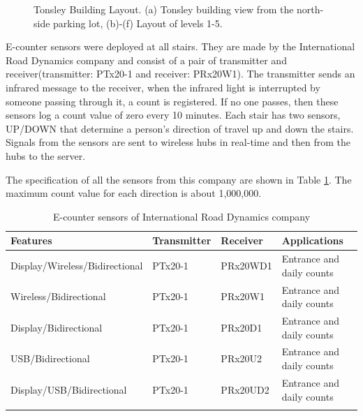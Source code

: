 \begin{figure}[ht]
\caption{Tonsley Building Layout. (a) Tonsley building view from the north-side parking lot, (b)-(f) Layout of levels 1-5.}
\label{laay}
\end{figure}

E-counter sensors were deployed at all stairs. They are made by the International Road Dynamics company and consist of a pair of transmitter and receiver(transmitter: PTx20-1 and receiver: PRx20W1). The transmitter sends an infrared message to the receiver, when the infrared light is interrupted by someone passing through it, a count is registered. If no one passes, then these sensors log a count value of zero every 10 minutes. Each stair has two sensors, UP/DOWN that determine a person's direction of travel up and down the stairs. Signals from the sensors are sent to wireless hubs in real-time and then from the hubs to the server. 

The specification of all the sensors from this company are shown in Table \ref{sensor}. The maximum count value for each direction is about 1,000,000.

\begin{table}[!h]{}
 \small
\centering
\caption{E-counter sensors of International Road Dynamics company}%
\begin{tabular}{llll}
 \toprule
\textbf{Features} & \textbf{Transmitter} & \textbf{Receiver}  & \textbf{Applications}     \\
\midrule
 Display/Wireless/Bidirectional     &  PTx20-1 & PRx20WD1 & Entrance and daily counts\\ 
Wireless/Bidirectional             &  PTx20-1 & PRx20W1  & Entrance and daily counts\\ 
 Display/Bidirectional              &  PTx20-1 & PRx20D1  & Entrance and daily counts\\ 
 USB/Bidirectional                  &  PTx20-1 & PRx20U2  & Entrance and daily counts\\ 
 Display/USB/Bidirectional          &  PTx20-1 & PRx20UD2 & Entrance and daily counts\\ 
 \bottomrule
 \label{sensor}
 \end{tabular}
 \end{table}



